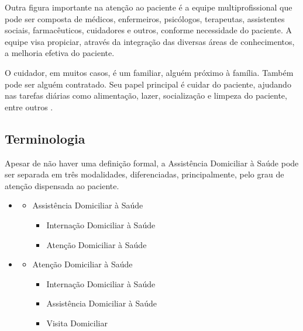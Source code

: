 Outra figura importante na atenção ao paciente é a equipe multiprofissional
que pode ser composta de médicos, enfermeiros, psicólogos, terapeutas,
assistentes sociais, farmacêuticos, cuidadores e outros, conforme necessidade
do paciente. A equipe visa propiciar, através da integração das diversas áreas 
de conhecimentos, a melhoria efetiva do paciente.

O cuidador, em muitos casos, é um familiar, alguém próximo à família. Também
pode ser alguém contratado. Seu papel principal é cuidar do paciente, ajudando
nas tarefas diárias como alimentação, lazer, socialização e limpeza do
paciente, entre outros \cite{amaral2001assistencia}.


\subsection{Terminologia}\label{subsec:terminologia}

Apesar de não haver uma definição formal, a Assistência Domiciliar à Saúde pode
ser separada em três modalidades, diferenciadas, principalmente, pelo grau de 
atenção dispensada ao paciente. 

\begin{itemize}
  \item \citeauthor{tavolari2000desenvolvimento}
    \begin{itemize}
      \item Assistência Domiciliar à Saúde
        \begin{itemize}
          \item Internação Domiciliar à Saúde
          \item Atenção Domiciliar à Saúde
        \end{itemize}
    \end{itemize}
  \item \citeauthor{giacomozzi2006pratica}
    \begin{itemize}
      \item Atenção Domiciliar à Saúde
        \begin{itemize}
          \item Internação Domiciliar à Saúde
          \item Assistência Domiciliar à Saúde
          \item Visita Domiciliar
        \end{itemize}
    \end{itemize}
\end{itemize}



